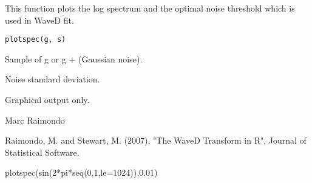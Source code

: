 \begin{Description}\relax
This function plots 
the log spectrum and the optimal noise threshold
which is used in WaveD fit.
\end{Description}
\begin{Usage}
\begin{verbatim}
plotspec(g, s)
\end{verbatim}
\end{Usage}
\begin{Arguments}
\begin{ldescription}
\item[\code{g}] Sample of g or g + (Gaussian noise).
\item[\code{s}] Noise standard deviation.
\end{ldescription}
\end{Arguments}
\begin{Value}
Graphical output only.
\end{Value}
\begin{Author}\relax
Marc Raimondo
\end{Author}
\begin{References}\relax
Raimondo, M. and Stewart, M. (2007),
"The WaveD Transform in R", Journal of Statistical Software.
\end{References}
\begin{SeeAlso}\relax
{}
\end{SeeAlso}
\begin{Examples}
\begin{ExampleCode}plotspec(sin(2*pi*seq(0,1,le=1024)),0.01) \end{ExampleCode}
\end{Examples}

